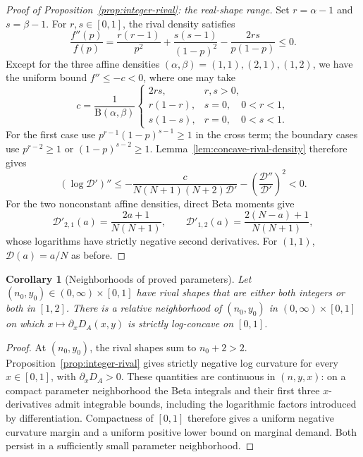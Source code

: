 \documentclass[11pt]{article}
\newcommand{\Bfun}{\mathrm{B}}
\newtheorem{corollary}{Corollary}
\theoremstyle{definition}
\begin{document}
\begin{proof}[Proof of Proposition~\ref{prop:integer-rival}: the real-shape range]
Set $r=\alpha-1$ and $s=\beta-1$. For $r,s\in[0,1]$, the rival density
satisfies
\begin{equation*}
\frac{f''(p)}{f(p)}
=\frac{r(r-1)}{p^2}+\frac{s(s-1)}{(1-p)^2}
 -\frac{2rs}{p(1-p)}\leq0.
\end{equation*}
Except for the three affine densities $(\alpha,\beta)=(1,1),(2,1),(1,2)$,
we have the uniform bound $f''\leq-c<0$, where one may take
\begin{equation*}
c=\frac{1}{\Bfun(\alpha,\beta)}
\begin{cases}
2rs,&r,s>0,\\
r(1-r),&s=0,\quad0<r<1,\\
s(1-s),&r=0,\quad0<s<1.
\end{cases}
\end{equation*}
For the first case use $p^{r-1}(1-p)^{s-1}\geq1$ in the cross term;
the boundary cases use $p^{r-2}\geq1$ or $(1-p)^{s-2}\geq1$.
Lemma~\ref{lem:concave-rival-density} therefore gives
\begin{equation*}
(\log\mathcal D')''\leq
-\frac{c}{N(N+1)(N+2)\mathcal D'}
-\left(\frac{\mathcal D''}{\mathcal D'}\right)^2<0.
\end{equation*}
For the two nonconstant affine densities, direct Beta moments give
\begin{equation*}
\mathcal D'_{2,1}(a)=\frac{2a+1}{N(N+1)},\qquad
\mathcal D'_{1,2}(a)=\frac{2(N-a)+1}{N(N+1)},
\end{equation*}
whose logarithms have strictly negative second derivatives. For $(1,1)$,
$\mathcal D(a)=a/N$ as before.
\end{proof}

\begin{corollary}[Neighborhoods of proved parameters]
\label{cor:integer-neighborhood}
Let $(n_0,y_0)\in(0,\infty)\times[0,1]$ have rival shapes that are either
both integers or both in $[1,2]$. There is a relative neighborhood of
$(n_0,y_0)$ in $(0,\infty)\times[0,1]$ on which
$x\mapsto\partial_xD_A(x,y)$ is strictly log-concave on $[0,1]$.
\end{corollary}

\begin{proof}
At $(n_0,y_0)$, the rival shapes sum to $n_0+2>2$.
Proposition~\ref{prop:integer-rival} gives strictly negative log curvature
for every $x\in[0,1]$, with $\partial_xD_A>0$. These quantities are
continuous in $(n,y,x)$: on a compact parameter neighborhood the Beta
integrals and their first three $x$-derivatives admit integrable bounds,
including the logarithmic factors introduced by differentiation.
Compactness of $[0,1]$ therefore gives a uniform negative curvature
margin and a uniform positive lower bound on marginal demand. Both
persist in a sufficiently small parameter neighborhood.
\end{proof}
\end{document}
